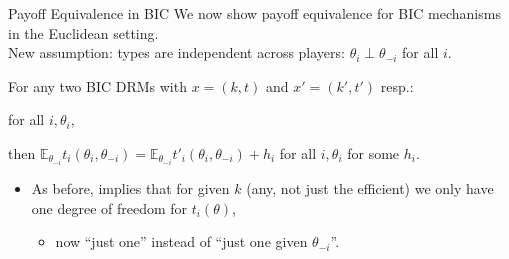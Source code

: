\documentclass[english,10pt
,aspectratio=169
,handout
]{beamer}
\begin{document}
\begin{frame}{Payoff Equivalence in BIC}
	We now show payoff equivalence for BIC mechanisms in the Euclidean setting.
	\\
	New \alert{assumption}: types are independent across players: $\theta_i \perp \theta_{-i}$ for all $i$.
	\begin{theorem}
		For any two BIC DRMs with $x = (k,t)$ and $x' = (k',t')$ resp.:
		
		 for all $i,\theta_i$,
		
		\alert{then $\mathbb{E}_{\theta_{-i}} t_i(\theta_i, \theta_{-i}) = \mathbb{E}_{\theta_{-i}} t'_i(\theta_i, \theta_{-i}) + h_i$} for all $i,\theta_i$ for some $h_i$.
	\end{theorem}
	\begin{itemize}
		\item As before, implies that for given $k$ (any, not just the efficient) we only have one degree of freedom for $t_i(\theta)$,
		\begin{itemize}
			\item now ``just one'' instead of ``just one given $\theta_{-i}$''.
		\end{itemize}
	\end{itemize}
\end{frame}
\end{document}
